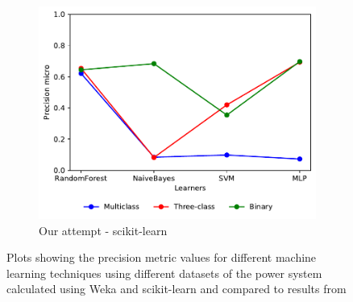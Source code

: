 \begin{figure}[H]
\begin{subfigure}[t]{110mm}
        \includegraphics[width=\linewidth, page = 3]{images/precision}
        \caption{Our attempt - scikit-learn}
    \end{subfigure}
    \caption{Plots showing the precision metric values for different machine learning techniques using different datasets of the power system calculated using Weka and scikit-learn and compared to results from \cite{borges_hink_machine_2014-1}}
    \label{fig:prec}
\end{figure}

